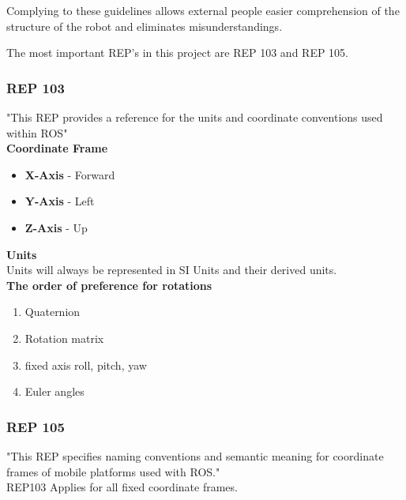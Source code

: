 Complying to these guidelines allows external people easier comprehension of the structure of the robot and eliminates misunderstandings.

The most important REP's in this project are REP 103 and REP 105.
\subsubsection{REP 103}
	
	"This REP provides a reference for the units and coordinate conventions used within ROS"\cite{REP103}\\  
	
	\textbf{Coordinate Frame}
	\begin{itemize}
		\item \textbf{X-Axis} - Forward
		\item \textbf{Y-Axis} - Left
		\item \textbf{Z-Axis} - Up
	\end{itemize}
	
	\textbf{Units}\\
	Units will always be represented in SI Units and their derived units.\\
	
	\textbf{The order of preference for rotations}
	\begin{enumerate}
		\item Quaternion
		\item Rotation matrix
		\item fixed axis roll, pitch, yaw
		\item Euler angles
	\end{enumerate}
	\cite{REP103}
	
\subsubsection{REP 105}
	"This REP specifies naming conventions and semantic meaning for coordinate frames of mobile platforms used with ROS."\cite{REP105}\\
	
	REP103 Applies for all fixed coordinate frames.
	

